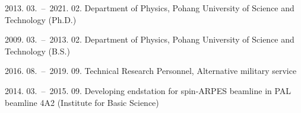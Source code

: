 \documentclass[doctor,english,final]{postech-ucs}
\begin{document}
    \begin{personaldata}
    \end{personaldata}

    \begin{education}
	\item[2013. 03.\ --\ 2021. 02.] Department of Physics, Pohang University of Science and Technology (Ph.D.)
	\item[2009. 03.\ --\ 2013. 02.] Department of Physics, Pohang University of Science and Technology (B.S.)
    \end{education}

   \begin{experience}
	\item[2016. 08.\ --\ 2019. 09.] Technical Research Personnel, Alternative military service
	\item[2014. 03.\ --\ 2015. 09.] Developing endstation for spin-ARPES beamline in PAL beamline 4A2 (Institute for Basic Science)
   \end{experience}



    \afterpage{\blankpage}  %

\end{document}
